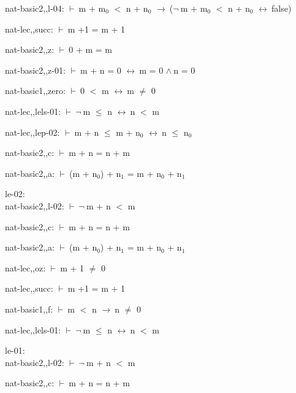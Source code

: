 \documentclass[a4paper]{article}
\newcommand{\Fol}{\mbox{$\vdash\ $}}
\newcommand{\Not}{\mbox{$\neg\ $}}
\newcommand{\And}{\mbox{$\wedge\ $}}
\newcommand{\Imp}{\mbox{$\rightarrow\ $}}
\newcommand{\Equiv}{\mbox{$\leftrightarrow\ $}}
\begin{document}
nat-basic2,,l-04: 
 \Fol m + $\mbox{m}_{0}$ $<$ n + $\mbox{n}_{0}$ \Imp (\Not m + $\mbox{m}_{0}$ $<$ n + $\mbox{n}_{0}$ \Equiv false)



nat-lec,,succ: 
 \Fol m +1 = m + 1



nat-basic2,,z: 
 \Fol 0 + m = m



nat-basic2,,z-01: 
 \Fol m + n = 0 \Equiv m = 0 \And n = 0



nat-basic1,,zero: 
 \Fol 0 $<$ m \Equiv m $\neq$ 0



nat-lec,,lels-01: 
 \Fol \Not m $\le$ n \Equiv n $<$ m



nat-lec,,lep-02: 
 \Fol m + n $\le$ m + $\mbox{n}_{0}$ \Equiv n $\le$ $\mbox{n}_{0}$



nat-basic2,,c: 
 \Fol m + n = n + m



nat-basic2,,a: 
 \Fol (m + $\mbox{n}_{0}$) + $\mbox{n}_{1}$ = m + $\mbox{n}_{0}$ + $\mbox{n}_{1}$



\bigskip

le-02:\\ nat-basic2,,l-02: 
 \Fol \Not m + n $<$ m



nat-basic2,,c: 
 \Fol m + n = n + m



nat-basic2,,a: 
 \Fol (m + $\mbox{n}_{0}$) + $\mbox{n}_{1}$ = m + $\mbox{n}_{0}$ + $\mbox{n}_{1}$



nat-lec,,oz: 
 \Fol m + 1 $\neq$ 0



nat-lec,,succ: 
 \Fol m +1 = m + 1



nat-basic1,,f: 
 \Fol m $<$ n \Imp n $\neq$ 0



nat-lec,,lels-01: 
 \Fol \Not m $\le$ n \Equiv n $<$ m



\bigskip

le-01:\\ nat-basic2,,l-02: 
 \Fol \Not m + n $<$ m



nat-basic2,,c: 
 \Fol m + n = n + m
\end{document}
